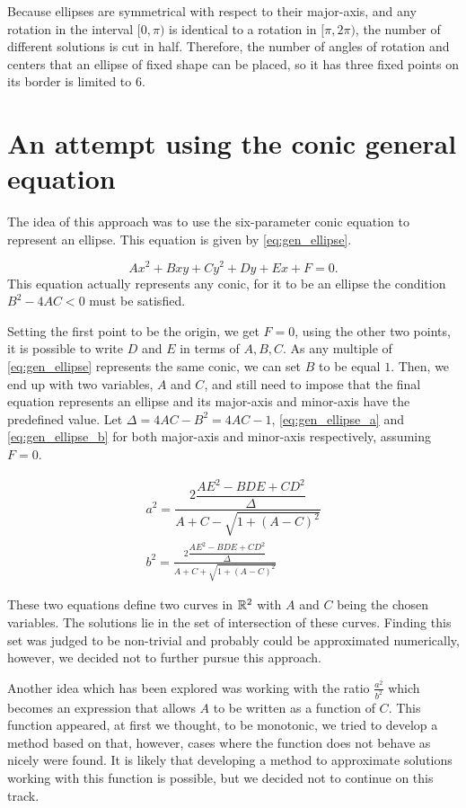 Because ellipses are symmetrical with respect to their major-axis, and any rotation in the interval $[0, \pi)$ is identical to a rotation in $[\pi, 2\pi)$, the number of different solutions is cut in half.
Therefore, the number of angles of rotation and centers that an ellipse of fixed shape can be placed, so it has three fixed points on its border is limited to $6$.

\section{An attempt using the conic general equation}

The idea of this approach was to use the six-parameter conic equation to represent an ellipse. This equation is given by \autoref{eq:gen_ellipse}.

\begin{equation}\label{eq:gen_ellipse}
Ax^2+Bxy+Cy^2+Dy+Ex+F=0.
\end{equation}
This equation actually represents any conic, for it to be an ellipse the condition $B^2 -4AC < 0$ must be satisfied.

Setting the first point to be the origin, we get $F=0$, using the other two points, it is possible to write $D$ and $E$ in terms of $A, B, C$. As any multiple of \autoref{eq:gen_ellipse} represents the same conic, we can set $B$ to be equal $1$. Then, we end up with two variables, $A$ and $C$, and still need to impose that the final equation represents an ellipse and its major-axis and minor-axis have the predefined value. Let $\Delta=4AC-B^2=4AC-1$, \autoref{eq:gen_ellipse_a} and \autoref{eq:gen_ellipse_b} for both major-axis and minor-axis respectively, assuming $F=0$.

\begin{align}\label{eq:gen_ellipse_a}
a^2 = \dfrac{2\dfrac{AE^2 -BDE +CD^2}{\Delta}}{A + C - \sqrt{1 + (A-C)^2}}\\
\label{eq:gen_ellipse_b}b^2 = \frac{2\dfrac{AE^2 -BDE +CD^2}{\Delta}}{A + C + \sqrt{1 + (A-C)^2}}
\end{align}

These two equations define two curves in $\mathbb{R}^2$ with $A$ and $C$ being the chosen variables. The solutions lie in the set of intersection of these curves. Finding this set was judged to be non-trivial and probably could be approximated numerically, however, we decided not to further pursue this approach.

Another idea which has been explored was working with the ratio $\frac{a^2}{b^2}$ which becomes an expression that allows $A$ to be written as a function of $C$. This function appeared, at first we thought, to be monotonic, we tried to develop a method based on that, however, cases where the function does not behave as nicely were found. It is likely that developing a method to approximate solutions working with this function is possible, but we decided not to continue on this track.


